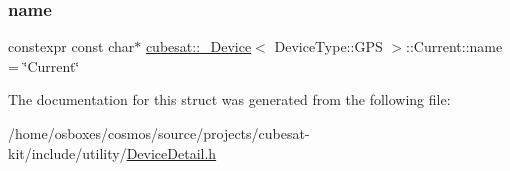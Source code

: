 \subsubsection{\texorpdfstring{name}{name}}
{\footnotesize\ttfamily constexpr const char$\ast$ \hyperlink{structcubesat_1_1__Device}{cubesat\+::\+\_\+\+Device}$<$ Device\+Type\+::\+G\+PS $>$\+::Current\+::name = \char`\"{}Current\char`\"{}\hspace{0.3cm}{\ttfamily [static]}}



The documentation for this struct was generated from the following file\+:\begin{DoxyCompactItemize}
\item 
/home/osboxes/cosmos/source/projects/cubesat-\/kit/include/utility/\hyperlink{DeviceDetail_8h}{Device\+Detail.\+h}\end{DoxyCompactItemize}
